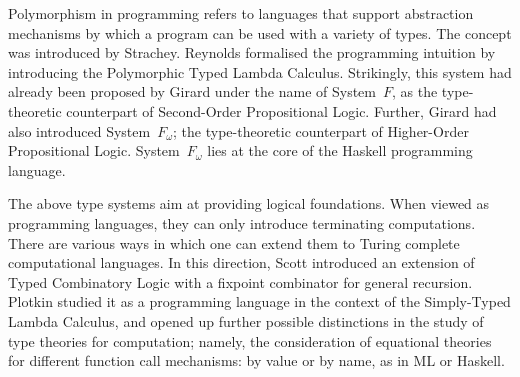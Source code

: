 \documentclass[11pt,twocolumn]{article}
\newcommand{\lcalculus}{\mbox{$\lambda$-calculus}}
\newcommand{\SystemF}{\mbox{System~$F$}}
\newcommand{\SystemFomega}{\mbox{System~$F_\omega$}}
\begin{document}
Polymorphism in programming refers to languages that support abstraction
mechanisms by which a program %
can be used with a variety of types.  The concept was introduced by 
Strachey. %
%
Reynolds %
formalised the programming intuition by introducing
the Polymorphic Typed Lambda Calculus. 
Strikingly,
this system had already been proposed %
by
Girard %
under the name of {\SystemF}, as the
type-theoretic counterpart of Second-Order Propositional Logic. 
Further, Girard had
also introduced {\SystemFomega}; the type-theoretic counterpart of
Higher-Order Propositional Logic.  
{\SystemFomega} lies at the core of the Haskell programming
language. %

The above type systems aim at providing logical foundations.  When viewed
as programming languages, they can only introduce terminating
computations.  There are various ways in which one can extend them to
Turing
complete computational languages.  In this direction, 
Scott %
introduced an extension of Typed Combinatory Logic with a fixpoint
combinator for general recursion.  Plotkin %
studied it as a programming language
in the context of the %
Simply-Typed Lambda Calculus, and %
opened up further possible distinctions in the study of type theories for
computation; namely, the consideration of equational theories for
different function call mechanisms: by value or by name,
as in ML or Haskell.  

\end{document}
